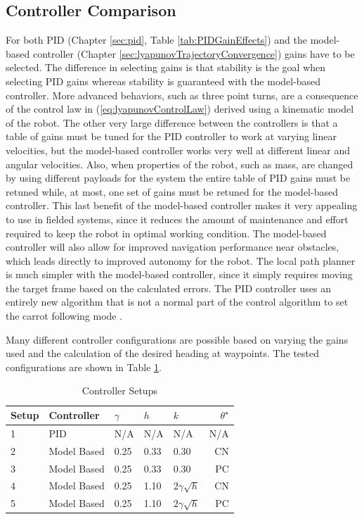 \subsection{Controller Comparison}
\label{sec:controllerComparison}
For both PID (Chapter \ref{sec:pid}, Table \ref{tab:PIDGainEffects}) and the model-based controller (Chapter \ref{sec:lyapunovTrajectoryConvergence}) gains have to be selected. The difference in selecting gains is that stability is the goal when selecting PID gains whereas stability is guaranteed with the model-based controller. More advanced behaviors, such as three point turns, are a consequence of the control law in (\ref{eq:lyapunovControlLaw}) derived using a kinematic model of the robot. The other very large difference between the controllers is that a table of gains must be tuned for the PID controller to work at varying linear velocities, but the model-based controller works very well at different linear and angular velocities. Also, when properties of the robot, such as mass, are changed by using different payloads for the system the entire table of PID gains must be retuned while, at most, one set of gains must be retuned for the model-based controller. This last benefit of the model-based controller makes it very appealing to use in fielded systems, since it reduces the amount of maintenance and effort required to keep the robot in optimal working condition. The model-based controller will also allow for improved navigation performance near obstacles, which leads directly to improved autonomy for the robot. The local path planner is much simpler with the model-based controller, since it simply requires moving the target frame based on the calculated errors. The PID controller uses an entirely new algorithm that is not a normal part of the control algorithm to set the carrot following mode \cite{Hogg02}.

Many different controller configurations are possible based on varying the gains used and the calculation of the desired heading at waypoints. The tested configurations are shown in Table \ref{tab:resultsControllersSetup}.

\begin{table}[ht!]
\caption{Controller Setups}
\small
\centering
\begin{tabular}{@{}lllllr@{}} \toprule
Setup & Controller  & $\gamma$ & $h$  & $k$               & $\theta^\star$ \\ \midrule
1     & PID         & N/A      & N/A  & N/A               & N/A \\
2     & Model Based & 0.25     & 0.33 & 0.30              & CN \\
3     & Model Based & 0.25     & 0.33 & 0.30              & PC \\
4     & Model Based & 0.25     & 1.10 & $2\gamma\sqrt{h}$ & CN \\
5     & Model Based & 0.25     & 1.10 & $2\gamma\sqrt{h}$ & PC \\ \bottomrule
\end{tabular}
\label{tab:resultsControllersSetup}
\end{table}

